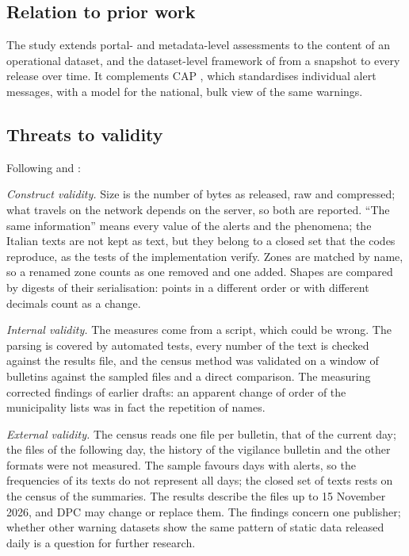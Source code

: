 \documentclass[review,authoryear,12pt]{elsarticle}
\begin{document}
\subsection{Relation to prior work}

The study extends portal- and metadata-level assessments
\citep{umbrich2015,neumaier2016,kubler2018} to the content of an operational
dataset, and the dataset-level framework of \citet{vetro2016} from a snapshot
to every release over time. It complements CAP \citep{westfall2010}, which
standardises individual alert messages, with a model for the national,
bulk view of the same warnings.

\subsection{Threats to validity}

Following \citet{wohlin2012} and \citet{runeson2009}:

\emph{Construct validity.} Size is the number of bytes as released, raw and
compressed; what travels on the network depends on the server, so both are
reported. ``The same information'' means every value of the alerts and the
phenomena; the Italian texts are not kept as text, but they belong to a closed
set that the codes reproduce, as the tests of the implementation verify. Zones
are matched by name, so a renamed zone counts as one removed and one added.
Shapes are compared by digests of their serialisation: points in a different
order or with different decimals count as a change.

\emph{Internal validity.} The measures come from a script, which could be
wrong. The parsing is covered by automated tests, every number of the text is
checked against the results file, and the census method was validated on a
window of bulletins against the sampled files and a direct comparison. The
measuring corrected findings of earlier drafts: an apparent change of order of
the municipality lists was in fact the repetition of names.

\emph{External validity.} The census reads one file per bulletin, that of the
current day; the files of the following day, the history of the vigilance
bulletin and the other formats were not measured. The sample favours days with
alerts, so the frequencies of its texts do not represent all days; the closed
set of texts rests on the census of the summaries. The results describe the
files up to 15 November 2026, and DPC may change or replace them. The findings
concern one publisher; whether other warning datasets show the same pattern
of static data released daily is a question for further research.
\end{document}
